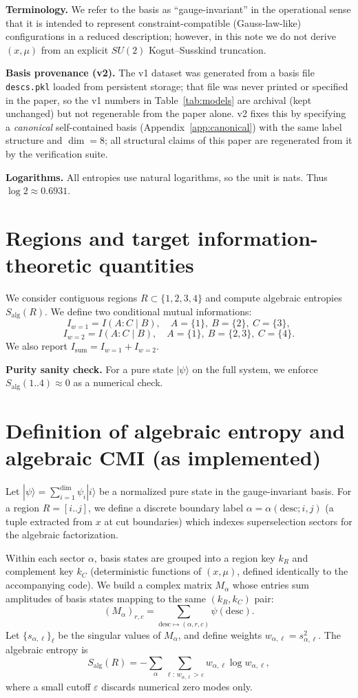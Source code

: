 \documentclass[11pt]{article}
\theoremstyle{remark}
\newcommand{\Salg}{S_{\mathrm{alg}}}
\begin{document}
\textbf{Terminology.} We refer to the basis as ``gauge-invariant'' in
the operational sense that it is intended to represent
constraint-compatible (Gauss-law-like) configurations in a reduced
description; however, in this note we do not derive $(x, \mu)$ from an
explicit $SU(2)$ Kogut--Susskind truncation.

\textbf{Basis provenance (v2).} The v1 dataset was generated from a
basis file \texttt{descs.pkl} loaded from persistent storage; that file
was never printed or specified in the paper, so the v1 numbers in
Table~\ref{tab:models} are archival (kept unchanged) but not regenerable
from the paper alone. v2 fixes this by specifying a \emph{canonical}
self-contained basis (Appendix~\ref{app:canonical}) with the same label
structure and $\dim = 8$; all structural claims of this paper are
regenerated from it by the verification suite.

\textbf{Logarithms.} All entropies use natural logarithms, so the unit
is nats. Thus $\log 2 \approx 0.6931$.

\section{Regions and target information-theoretic quantities}

We consider contiguous regions $R \subset \{1, 2, 3, 4\}$ and compute
algebraic entropies $\Salg(R)$. We define two conditional mutual
informations:
\[
I_{w=1} = I(A : C \mid B), \quad A = \{1\},\ B = \{2\},\ C = \{3\},
\]
\[
I_{w=2} = I(A : C \mid B), \quad A = \{1\},\ B = \{2, 3\},\ C = \{4\}.
\]
We also report $I_{\mathrm{sum}} = I_{w=1} + I_{w=2}$.

\textbf{Purity sanity check.} For a pure state $|\psi\rangle$ on the
full system, we enforce $\Salg(1..4) \approx 0$ as a numerical check.

\section{Definition of algebraic entropy and algebraic CMI (as
implemented)}

Let $|\psi\rangle = \sum_{i=1}^{\dim} \psi_i |i\rangle$ be a normalized
pure state in the gauge-invariant basis. For a region $R = [i..j]$, we
define a discrete boundary label $\alpha = \alpha(\mathrm{desc}; i, j)$
(a tuple extracted from $x$ at cut boundaries) which indexes
superselection sectors for the algebraic factorization.

Within each sector $\alpha$, basis states are grouped into a region key
$k_R$ and complement key $k_C$ (deterministic functions of $(x, \mu)$,
defined identically to the accompanying code). We build a complex matrix
$M_\alpha$ whose entries sum amplitudes of basis states mapping to the
same $(k_R, k_C)$ pair:
\[
(M_\alpha)_{r,c} = \sum_{\mathrm{desc} \mapsto (\alpha, r, c)}
\psi(\mathrm{desc}).
\]
Let $\{s_{\alpha,\ell}\}_\ell$ be the singular values of $M_\alpha$, and
define weights $w_{\alpha,\ell} = s^2_{\alpha,\ell}$. The algebraic
entropy is
\[
\Salg(R) = -\sum_\alpha \sum_{\ell:\, w_{\alpha,\ell} > \varepsilon}
w_{\alpha,\ell} \log w_{\alpha,\ell},
\]
where a small cutoff $\varepsilon$ discards numerical zero modes only.
\end{document}
